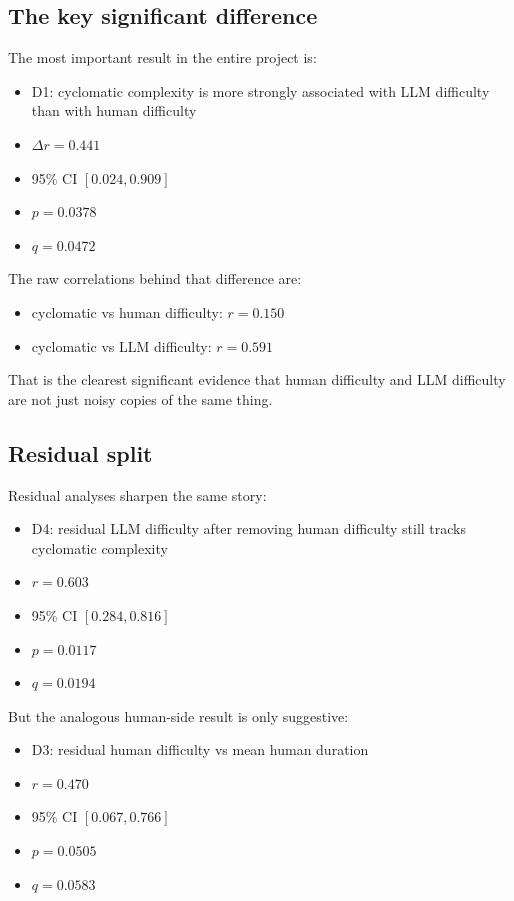 \documentclass[11pt]{article}
\begin{document}
\subsection*{The key significant difference}

The most important result in the entire project is:

\begin{itemize}
  \item D1: cyclomatic complexity is more strongly associated with LLM difficulty than with human difficulty
  \item $\Delta r = 0.441$
  \item 95\% CI $[0.024, 0.909]$
  \item $p = 0.0378$
  \item $q = 0.0472$
\end{itemize}

The raw correlations behind that difference are:

\begin{itemize}
  \item cyclomatic vs human difficulty: $r = 0.150$
  \item cyclomatic vs LLM difficulty: $r = 0.591$
\end{itemize}

That is the clearest significant evidence that human difficulty and LLM difficulty are not just noisy copies of the same thing.

\subsection*{Residual split}

Residual analyses sharpen the same story:

\begin{itemize}
  \item D4: residual LLM difficulty after removing human difficulty still tracks cyclomatic complexity
  \item $r = 0.603$
  \item 95\% CI $[0.284, 0.816]$
  \item $p = 0.0117$
  \item $q = 0.0194$
\end{itemize}

But the analogous human-side result is only suggestive:

\begin{itemize}
  \item D3: residual human difficulty vs mean human duration
  \item $r = 0.470$
  \item 95\% CI $[0.067, 0.766]$
  \item $p = 0.0505$
  \item $q = 0.0583$
\end{itemize}
\end{document}
